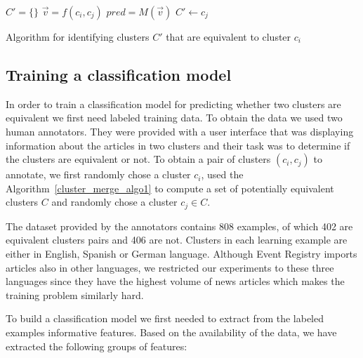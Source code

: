 \documentclass[twoside,11pt]{article}
\begin{document}
\begin{algorithm}[tb!]

$C' = \{\}$\;
 {
    $\vec{v} = f(c_i, c_j)$\;
    $pred = M(\vec{v})$\;
     {
        $C' \leftarrow c_j$
    }
}
\caption{Algorithm for identifying clusters $C'$ that are equivalent to cluster $c_i$}
\label{cluster_merge_algo2}
\end{algorithm}

\subsection{Training a classification model}

In order to train a classification model for predicting whether two clusters are equivalent we first need labeled training data. To obtain the data we used two human annotators. They were provided with a user interface that was displaying information about the articles in two clusters and their task was to determine if the clusters are equivalent or not. To obtain a pair of clusters $(c_i, c_j)$ to annotate, we first randomly chose a cluster $c_i$, used the Algorithm~\ref{cluster_merge_algo1} to compute a set of potentially equivalent clusters $C$ and randomly chose a cluster $c_j \in C$.

The dataset provided by the annotators contains 808 examples, of which 402 are equivalent clusters pairs and 406 are not. Clusters in each learning example are either in English, Spanish or German language. Although Event Registry imports articles also in other languages, we restricted our experiments to these three languages since they have the highest volume of news articles which makes the training problem similarly hard.

To build a classification model we first needed to extract from the labeled examples informative features. Based on the availability of the data, we have extracted the following groups of features:
\end{document}
